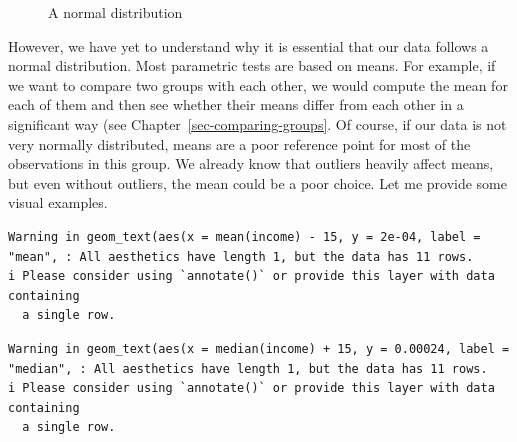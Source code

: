 \documentclass[
  letterpaper,
]{krantz}
\begin{document}
\begin{figure}


\caption{\label{fig-normal-distribution2}A normal distribution}

\end{figure}%

However, we have yet to understand why it is essential that our data
follows a normal distribution. Most parametric tests are based on means.
For example, if we want to compare two groups with each other, we would
compute the mean for each of them and then see whether their means
differ from each other in a significant way (see
Chapter~\ref{sec-comparing-groups}. Of course, if our data is not very
normally distributed, means are a poor reference point for most of the
observations in this group. We already know that outliers heavily affect
means, but even without outliers, the mean could be a poor choice. Let
me provide some visual examples.

\begin{verbatim}
Warning in geom_text(aes(x = mean(income) - 15, y = 2e-04, label = "mean", : All aesthetics have length 1, but the data has 11 rows.
i Please consider using `annotate()` or provide this layer with data containing
  a single row.
\end{verbatim}

\begin{verbatim}
Warning in geom_text(aes(x = median(income) + 15, y = 0.00024, label = "median", : All aesthetics have length 1, but the data has 11 rows.
i Please consider using `annotate()` or provide this layer with data containing
  a single row.
\end{verbatim}
\end{document}
